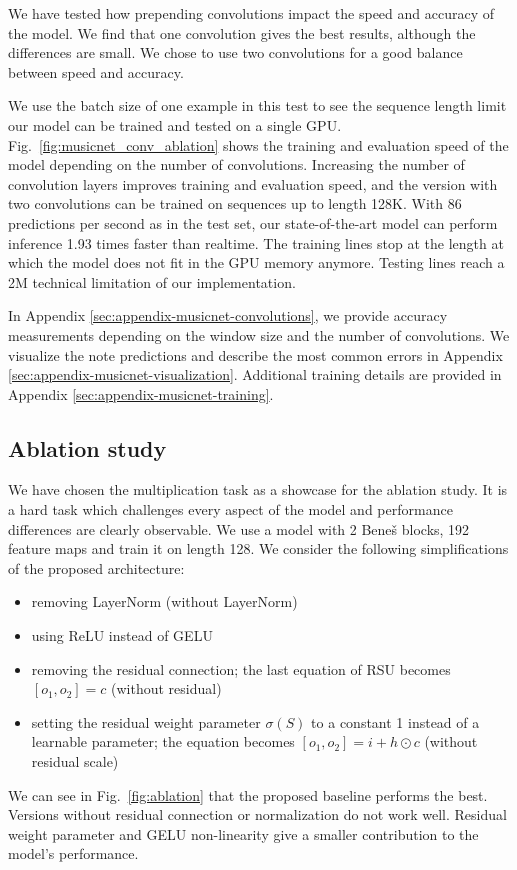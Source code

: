 \documentclass[letterpaper]{article} %
\begin{document}
We have tested how prepending convolutions impact the speed and accuracy of the model. We find that one convolution gives the best results, although the differences are small. We chose to use two convolutions for a good balance between speed and accuracy.

We use the batch size of one example in this test to see the sequence length limit our model can be trained and tested on a single GPU. Fig.~\ref{fig:musicnet_conv_ablation} shows the training and evaluation speed of the model depending on the number of convolutions. Increasing the number of convolution layers improves training and evaluation speed, and the version with two convolutions can be trained on sequences up to length 128K. With 86 predictions per second as in the test set, our state-of-the-art model can perform inference 1.93 times faster than realtime. The training lines stop at the length at which the model does not fit in the GPU memory anymore. Testing lines reach a 2M technical limitation of our implementation.

In Appendix \ref{sec:appendix-musicnet-convolutions}, we provide accuracy measurements depending on the window size and the number of convolutions. We visualize the note predictions and describe the most common errors in Appendix \ref{sec:appendix-musicnet-visualization}. Additional training details are provided in Appendix \ref{sec:appendix-musicnet-training}.

\subsection{Ablation study}
\label{sec:ablation}

We have chosen the multiplication task as a showcase for the ablation study. It is a hard task which challenges every aspect of the model and performance differences are clearly observable. We use a model with 2 Bene\v{s} blocks, 192 feature maps and train it on length 128. We consider the following simplifications of the proposed architecture:
\begin{itemize}
  \item removing LayerNorm (without LayerNorm)
  \item using ReLU instead of GELU
  \item removing the residual connection; the last equation of RSU becomes $[o_1, o_2] = c$ (without residual)
  \item setting the residual weight parameter $\sigma(S)$ to a constant 1 instead of a learnable parameter; the equation becomes $[o_1, o_2] = i +  h\odot c$ (without residual scale)
\end{itemize}
 We can see in Fig.~\ref{fig:ablation} that the proposed baseline performs the best. Versions without residual connection or normalization do not work well. Residual weight parameter and GELU non-linearity give a smaller contribution to the model's performance.
\end{document}
